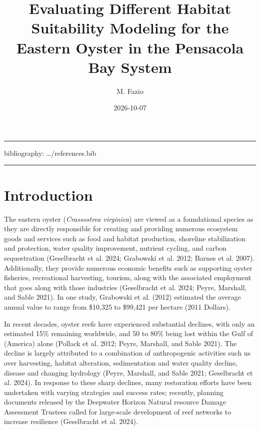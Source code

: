 \documentclass[
  letterpaper,
  DIV=11,
  numbers=noendperiod]{scrartcl}
\title{Evaluating Different Habitat Suitability Modeling for the Eastern
Oyster in the Pensacola Bay System}
\author{M. Fazio}
\date{2026-10-07}
\renewcommand*\contentsname{Table of contents}
\newcommand\contentsname{Table of contents}
\begin{document}
\maketitle

\renewcommand*\contentsname{Table of contents}
{
\hypersetup{linkcolor=}
\setcounter{tocdepth}{3}
\tableofcontents
}

\begin{center}\rule{0.5\linewidth}{0.5pt}\end{center}

bibliography: \ldots/references.bib

\begin{center}\rule{0.5\linewidth}{0.5pt}\end{center}

\section{Introduction}\label{introduction}

The eastern oyster (\emph{Crassostrea virginica}) are viewed as a
foundational species as they are directly responsible for creating and
providing numerous ecosystem goods and services such as food and habitat
production, shoreline stabilization and protection, water quality
improvement, nutrient cycling, and carbon sequestration (Geselbracht et
al. 2024; Grabowski et al. 2012; Barnes et al. 2007). Additionally, they
provide numerous economic benefits such as supporting oyster fisheries,
recreational harvesting, tourism, along with the associated employment
that goes along with those industries (Geselbracht et al. 2024; Peyre,
Marshall, and Sable 2021). In one study, Grabowski et al. (2012)
estimated the average annual value to range from \$10,325 to \$99,421
per hectare (2011 Dollars).

In recent decades, oyster reefs have experienced substantial declines,
with only an estimated 15\% remaining worldwide, and 50 to 80\% being
lost within the Gulf of (America) alone (Pollack et al. 2012; Peyre,
Marshall, and Sable 2021). The decline is largely attributed to a
combination of anthropogenic activities such us over harvesting, habitat
alteration, sedimentation and water quality decline, disease and
changing hydrology (Peyre, Marshall, and Sable 2021; Geselbracht et al.
2024). In response to these sharp declines, many restoration efforts
have been undertaken with varying strategies and success rates;
recently, planning documents released by the Deepwater Horizon Natural
resource Damage Assessment Trustees called for large-scale development
of reef networks to increase resilience (Geselbracht et al. 2024).
\end{document}
